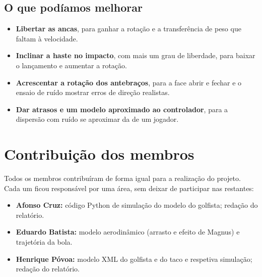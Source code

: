 \documentclass[11pt,a4paper]{article}
\begin{document}
\subsection*{\textcolor{azul}{O que podíamos melhorar}}

\begin{itemize}[itemsep=3pt]
  \item \textbf{Libertar as ancas}, para ganhar a rotação e a transferência de
        peso que faltam à velocidade.
  \item \textbf{Inclinar a haste no impacto}, com mais um grau de liberdade,
        para baixar o lançamento e aumentar a rotação.
  \item \textbf{Acrescentar a rotação dos antebraços}, para a face abrir e
        fechar e o ensaio de ruído mostrar erros de direção realistas.
  \item \textbf{Dar atrasos e um modelo aproximado ao controlador}, para a
        dispersão com ruído se aproximar da de um jogador.
\end{itemize}
\newpage
\section*{Contribuição dos membros}
Todos os membros contribuíram de forma igual para a realização do projeto.
Cada um ficou responsável por uma área, sem deixar de participar nas restantes:
\begin{itemize}
  \item \textbf{Afonso Cruz:} código Python de simulação do modelo do golfista;
        redação do relatório.
  \item \textbf{Eduardo Batista:} modelo aerodinâmico (arrasto e efeito de
        Magnus) e trajetória da bola.
  \item \textbf{Henrique Póvoa:} modelo XML do golfista e do taco e respetiva
        simulação; redação do relatório.
\end{itemize}



\end{document}
